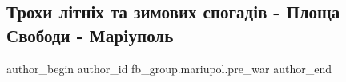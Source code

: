  
 
 
 
 

\subsection{Трохи літніх та зимових спогадів - Площа Свободи - Марiуполь}
\label{sec:12_02_2023.fb.fb_group.mariupol.pre_war.7.trokhi_l_tn_kh_ta_zi}

\ifcmt
 author_begin
   author_id fb_group.mariupol.pre_war
 author_end
\fi
